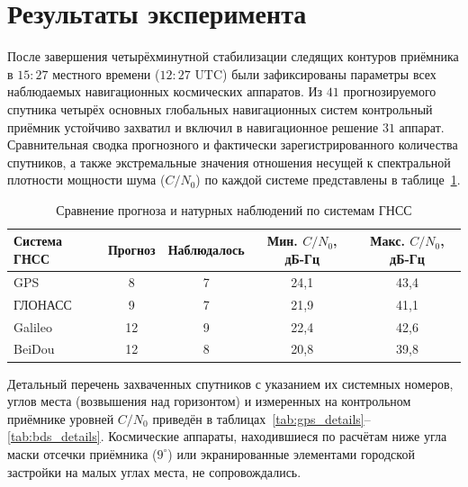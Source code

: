 \section{Результаты эксперимента}

После завершения четырёхминутной стабилизации следящих контуров приёмника в $15{:}27$ местного времени ($12{:}27\text{ UTC}$) были зафиксированы параметры всех наблюдаемых навигационных космических аппаратов. Из $41$ прогнозируемого спутника четырёх основных глобальных навигационных систем контрольный приёмник устойчиво захватил и включил в навигационное решение $31$ аппарат. Сравнительная сводка прогнозного и фактически зарегистрированного количества спутников, а также экстремальные значения отношения несущей к спектральной плотности мощности шума ($C/N_0$) по каждой системе представлены в таблице~\ref{tab:summary_results}.

\begin{table}[H]
    \centering
    \small
    \caption{Сравнение прогноза и натурных наблюдений по системам ГНСС}
    \label{tab:summary_results}
    \begin{tabular}{|l|c|c|c|c|}
        \hline
        Система ГНСС & Прогноз & Наблюдалось & Мин. $C/N_0$, дБ-Гц & Макс. $C/N_0$, дБ-Гц \\
        \hline
        GPS & 8 & 7 & 24,1 & 43,4 \\
        \hline
        ГЛОНАСС & 9 & 7 & 21,9 & 41,1 \\
        \hline
        Galileo & 12 & 9 & 22,4 & 42,6 \\
        \hline
        BeiDou & 12 & 8 & 20,8 & 39,8 \\
        \hline
    \end{tabular}
\end{table}

Детальный перечень захваченных спутников с указанием их системных номеров, углов места (возвышения над горизонтом) и измеренных на контрольном приёмнике уровней $C/N_0$ приведён в таблицах~\ref{tab:gps_details}--\ref{tab:bds_details}. Космические аппараты, находившиеся по расчётам ниже угла маски отсечки приёмника ($9^\circ$) или экранированные элементами городской застройки на малых углах места, не сопровождались.

